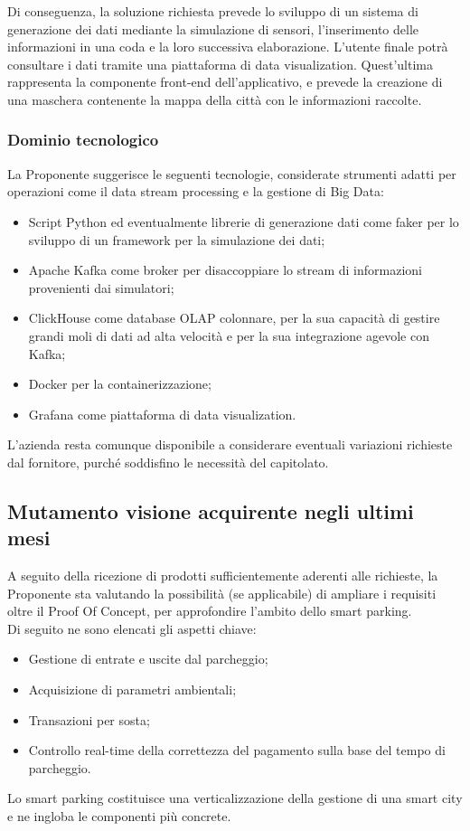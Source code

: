 Di conseguenza, la soluzione richiesta prevede lo sviluppo di un sistema di generazione dei dati mediante la simulazione di sensori, l’inserimento delle informazioni in una coda e la loro successiva elaborazione. L'utente finale potrà consultare i dati tramite una piattaforma di data visualization. Quest'ultima rappresenta la componente front-end dell'applicativo, e prevede la creazione di una maschera contenente la mappa della città con le informazioni raccolte.

\subsubsection{Dominio tecnologico}
La Proponente suggerisce le seguenti tecnologie, considerate strumenti adatti per operazioni come il data stream processing e la gestione di Big Data:
\begin{itemize}
  \item Script Python ed eventualmente librerie di generazione dati come faker per lo sviluppo di un framework per la simulazione dei dati;
  \item Apache Kafka come broker per disaccoppiare lo stream di informazioni provenienti dai simulatori;
  \item ClickHouse come database OLAP colonnare, per la sua capacità di gestire grandi moli di dati ad alta velocità e per la sua integrazione agevole con Kafka;
  \item Docker per la containerizzazione;
  \item Grafana come piattaforma di data visualization.
\end{itemize}
L’azienda resta comunque disponibile a considerare eventuali variazioni richieste dal fornitore, purché soddisfino le necessità del capitolato.

\subsection{Mutamento visione acquirente negli ultimi mesi}
A seguito della ricezione di prodotti sufficientemente aderenti alle richieste, la Proponente sta valutando la possibilità (se applicabile) di ampliare i requisiti oltre il Proof Of Concept, per approfondire l'ambito dello smart parking.\\
Di seguito ne sono elencati gli aspetti chiave:
\begin{itemize}
  \item Gestione di entrate e uscite dal parcheggio;
  \item Acquisizione di parametri ambientali;
  \item Transazioni per sosta;
  \item Controllo real-time della correttezza del pagamento sulla base del tempo di 	parcheggio.
\end{itemize}
Lo smart parking costituisce una verticalizzazione della gestione di una smart city e ne ingloba le componenti più concrete.

